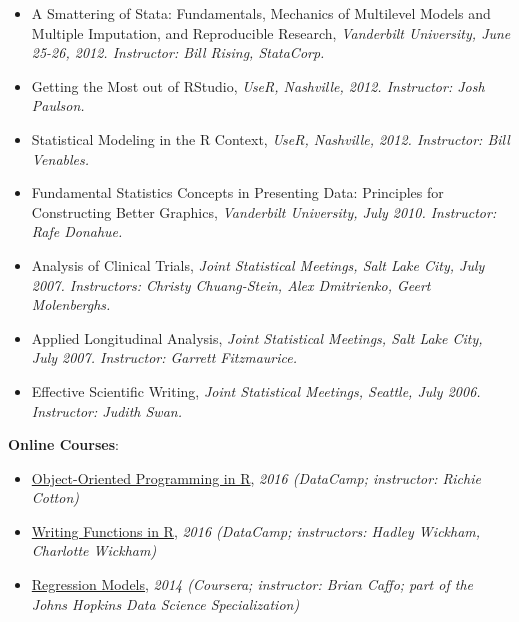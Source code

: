 \documentclass[5pt]{article}
\begin{document}
\begin{itemize}
\item A Smattering of Stata: Fundamentals, Mechanics of Multilevel Models and Multiple Imputation, and Reproducible Research, \emph{Vanderbilt University, June 25-26, 2012. Instructor: Bill Rising, StataCorp.}
\item Getting the Most out of RStudio, \emph{UseR, Nashville, 2012. Instructor: Josh Paulson.}
\item Statistical Modeling in the R Context, \emph{UseR, Nashville, 2012. Instructor: Bill Venables.}
\item Fundamental Statistics Concepts in Presenting Data: Principles for Constructing Better Graphics, \emph{Vanderbilt University, July 2010. Instructor: Rafe Donahue.}
\item Analysis of Clinical Trials, \emph{Joint Statistical Meetings, Salt Lake City, July 2007. Instructors: Christy Chuang-Stein, Alex Dmitrienko, Geert Molenberghs.}
\item Applied Longitudinal Analysis, \emph{Joint Statistical Meetings, Salt Lake City, July 2007. Instructor: Garrett Fitzmaurice.}
\item Effective Scientific Writing, \emph{Joint Statistical Meetings, Seattle, July 2006. Instructor: Judith Swan.}
\end{itemize}

\pagebreak
\noindent \textbf{Online Courses}:
\begin{itemize}
\item \href{https://www.datacamp.com/courses/object-oriented-programming-in-r-s3-and-r6}{Object-Oriented Programming in R}, \emph{2016 (DataCamp; instructor: Richie Cotton)}
\item \href{https://www.datacamp.com/courses/writing-functions-in-r}{Writing Functions in R}, \emph{2016 (DataCamp; instructors: Hadley Wickham, Charlotte Wickham)}
\item \href{https://www.coursera.org/learn/regression-models}{Regression Models}, \emph{2014 (Coursera; instructor: Brian Caffo; part of the Johns Hopkins Data Science Specialization)}
\end{itemize}
\end{document}
